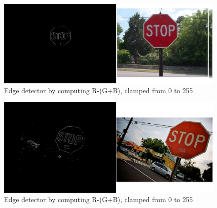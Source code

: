 \documentclass{article}
\begin{document}
\begin{itemize}
\begin{enumerate}

 \end{enumerate} 
\end{itemize} 

\pagebreak

\begin{center}
 \begin{figure}
  \includegraphics[width=\textwidth]{1.png}
  \caption{Edge detector by computing R-(G+B), clamped from 0 to 255}
 \end{figure}
 \begin{figure}
  \includegraphics[width=\textwidth]{3.png}
  \caption{Edge detector by computing R-(G+B), clamped from 0 to 255}
 \end{figure}
\end{center}
\end{document}
